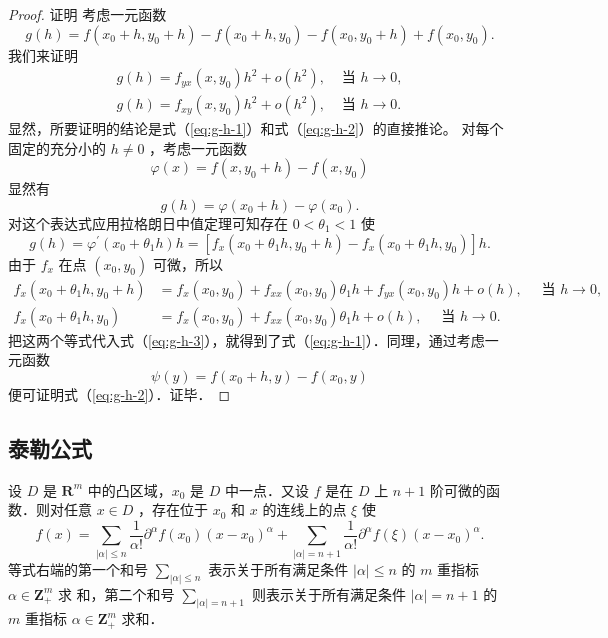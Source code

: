 \begin{proof}
    证明 考虑一元函数
$$
g(h)=f\left(x_0+h, y_0+h\right)-f\left(x_0+h, y_0\right)-f\left(x_0, y_0+h\right)+f\left(x_0, y_0\right) .
$$
我们来证明
\begin{align}
g(h)=f_{y x}\left(x, y_0\right) h^2+o\left(h^2\right), & \text { 当 } h \rightarrow 0,\label{eq:g-h-1} \\
g(h)=f_{x y}\left(x, y_0\right) h^2+o\left(h^2\right), & \text { 当 } h \rightarrow 0.\label{eq:g-h-2}
\end{align}
显然，所要证明的结论是式（\ref{eq:g-h-1}）和式（\ref{eq:g-h-2}）的直接推论。
对每个固定的充分小的 $h \neq 0$ ，考虑一元函数
$$
\varphi(x)=f\left(x, y_0+h\right)-f\left(x, y_0\right)
$$
显然有
$$
g(h)=\varphi\left(x_0+h\right)-\varphi\left(x_0\right) .
$$
对这个表达式应用拉格朗日中值定理可知存在 $0<\theta_1<1$ 使
\begin{equation}\label{eq:g-h-3}
    g(h)=\varphi^{\prime}\left(x_0+\theta_1 h\right) h=\left[f_x\left(x_0+\theta_1 h, y_0+h\right)-f_x\left(x_0+\theta_1 h, y_0\right)\right] h .
\end{equation}
由于 $f_x$ 在点 $\left(x_0, y_0\right)$ 可微，所以
$$
\begin{aligned}
f_x\left(x_0+\theta_1 h, y_0+h\right) & =f_x\left(x_0, y_0\right)+f_{x x}\left(x_0, y_0\right) \theta_1 h+f_{y x}\left(x_0, y_0\right) h+o(h), \quad \text { 当 } h \rightarrow 0, \\
f_x\left(x_0+\theta_1 h, y_0\right) & =f_x\left(x_0, y_0\right)+f_{x x}\left(x_0, y_0\right) \theta_1 h+o(h), \quad \text { 当 } h \rightarrow 0 .
\end{aligned}
$$
把这两个等式代入式（\ref{eq:g-h-3}），就得到了式（\ref{eq:g-h-1}）．同理，通过考虑一元函数
$$
\psi(y)=f\left(x_0+h, y\right)-f\left(x_0, y\right)
$$
便可证明式（\ref{eq:g-h-2}）．证毕．
\end{proof}



\subsection{泰勒公式}
\begin{theorem}[泰勒公式]
    设 $D$ 是 $\mathbf{R}^m$ 中的凸区域，$x_0$ 是 $D$ 中一点．又设 $f$ 是在 $D$ 上 $n+1$ 阶可微的函数．则对任意 $x \in D$ ，存在位于 $x_0$ 和 $x$ 的连线上的点 $\xi$ 使
$$
f(x)=\sum_{|\alpha| \leqslant n} \frac{1}{\alpha!} \partial^\alpha f\left(x_0\right)\left(x-x_0\right)^\alpha+\sum_{|\alpha|=n+1} \frac{1}{\alpha!} \partial^\alpha f(\xi)\left(x-x_0\right)^\alpha .
$$
等式右端的第一个和号 $\sum_{|\alpha| \leqslant n}$ 表示关于所有满足条件 $|\alpha| \leqslant n$ 的 $m$ 重指标 $\alpha \in \mathbf{Z}_{+}^m$ 求
和，第二个和号 $\sum_{|\alpha|=n+1}$ 则表示关于所有满足条件 $|\alpha|=n+1$ 的 $m$ 重指标 $\alpha \in \mathbf{Z}_{+}^m$ 求和．
\end{theorem}


